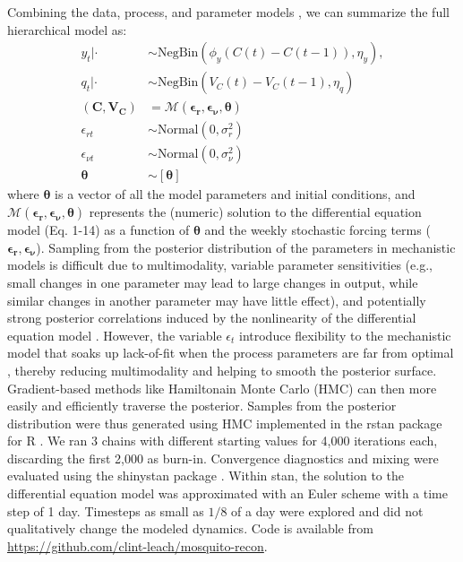 \documentclass[10pt,letterpaper]{article}
\begin{document}
Combining the data, process, and parameter models \cite{Berliner1996}, we can summarize the full hierarchical model as:
\begin{align}
y_t | \cdot & \sim \text{NegBin}(\phi_y (C(t) - C(t-1)), \eta_y),
\\
q_t | \cdot &\sim \text{NegBin}(V_{C}(t) - V_{C}(t-1), \eta_q)\\
(\mathbf{C}, \mathbf{V_C}) & = \mathcal{M}(\boldsymbol{\epsilon_r}, \boldsymbol{\epsilon_{\nu}},\boldsymbol{\theta})\\
\epsilon_{rt} & \sim \text{Normal}(0, \sigma^2_r)\\
\epsilon_{\nu t} & \sim \text{Normal}(0, \sigma^2_{\nu})\\
\boldsymbol{\theta} & \sim [\boldsymbol{\theta}]
\end{align}
where $\boldsymbol{\theta}$ is a vector of all the model parameters and initial conditions, and $\mathcal{M}(\boldsymbol{\epsilon_r}, \boldsymbol{\epsilon_{\nu}},\boldsymbol{\theta})$ represents the (numeric) solution to the differential equation model (Eq. 1-14) as a function of $\boldsymbol{\theta}$ and the weekly stochastic forcing terms ($\boldsymbol{\epsilon_{r}}, \boldsymbol{\epsilon_{\nu}}$).
Sampling from the posterior distribution of the parameters in mechanistic models is difficult due to multimodality, variable parameter sensitivities (e.g., small changes in one parameter may lead to large changes in output, while similar changes in another parameter may have little effect), and potentially strong posterior correlations induced by the nonlinearity of the differential equation model \cite{Reilly2005, Girolami2008, Calderhead2011}.
However, the variable $\epsilon_t$ introduce flexibility to the mechanistic model that 
soaks up lack-of-fit when the process parameters are far from optimal \cite{Leander2014}, thereby reducing multimodality and helping to smooth the posterior surface.
Gradient-based methods like Hamiltonain Monte Carlo (HMC) can then more easily and efficiently traverse the posterior.
Samples from the posterior distribution were thus generated using HMC implemented in the rstan package \cite{Carpenter2016, Rstan2017} for R \cite{R2016}. 
We ran 3 chains with different starting values for 4,000 iterations each, discarding the first 2,000 as burn-in.
Convergence diagnostics and mixing were evaluated using the shinystan package \cite{shinystan}.
Within stan, the solution to the differential equation model was approximated with an Euler scheme with a time step of 1 day.  
Timesteps as small as $1/8$ of a day were explored and did not qualitatively change the modeled dynamics.
Code is available from \href{https://github.com/clint-leach/mosquito-recon}{https://github.com/clint-leach/mosquito-recon}.
\end{document}
